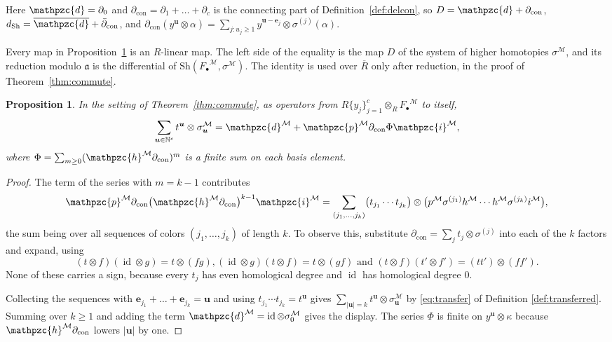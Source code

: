 \documentclass[12pt]{amsart}
\theoremstyle{plain}
\newtheorem{proposition}[theorem]{Proposition}
\theoremstyle{definition}
\newcommand{\dcon}{\partial_{\mathrm{con}}}
\newcommand{\F}{ {F_\bullet} }
\newcommand{\Rbar}{\overline{R}}
\newcommand{\M}{\mathcal{M}}
\newcommand{\lift}[1]{\mathpzc{#1}}
\newcommand{\id}{\operatorname{id}}
\newcommand{\aaa}{\mathfrak{a}}
\newcommand{\N}{\mathbb{N}}
\newcommand{\Sh}{\mathrm{Sh}}
\begin{document}
Here $\lift{d} = \partial_0$ and $\dcon = \partial_1 + \dots + \partial_c$ is the connecting part of Definition~\ref{def:delcon}, so $D = \lift{d} + \dcon$, $d_{\Sh} = \overline{\lift{d}} + \bar\partial_{\mathrm{con}}$, and $\dcon(y^{\boldsymbol{u}} \otimes \alpha) = \sum_{j : u_j \ge 1} y^{\boldsymbol{u} - \boldsymbol{e}_j} \otimes \sigma^{(j)}(\alpha)$.

Every map in Proposition~\ref{prop:closed} is an $R$-linear map.
The left side of the equality is the map $D$ of the system of higher homotopies $\sigma^{\M}$, and its reduction modulo $\aaa$ is the differential of $\Sh(\F^{\M}, \sigma^{\M})$. The identity is used over $\Rbar$ only after reduction, in the proof of Theorem~\ref{thm:commute}.

\begin{proposition}\label{prop:closed}
     In the setting of Theorem~\ref{thm:commute}, as operators from $R\{y_j\}_{j=1}^{c} \otimes_R \F^{\M}$ to itself,
    \[
        \sum_{\boldsymbol{u} \in \N^c} t^{\boldsymbol{u}} \otimes \sigma^{\M}_{\boldsymbol{u}} = \lift{d}^{\M} + \lift{p}^{\M} \dcon \Phi \lift{i}^{\M} ,
    \]
    where $\Phi = \sum_{m \ge 0} (\lift{h}^{\M} \dcon)^m$ is a finite sum on each basis element.
\end{proposition}

\begin{proof}
    The term of the series with $m = k - 1$ contributes
     \[
        \lift{p}^{\M} \dcon \bigl( \lift{h}^{\M} \dcon \bigr)^{k-1} \lift{i}^{\M} = \sum_{(j_1, \dots, j_k)} \bigl( t_{j_1} \cdots t_{j_k} \bigr) \otimes \bigl( p^{\M} \sigma^{(j_1)} h^{\M} \cdots h^{\M} \sigma^{(j_k)} i^{\M} \bigr),
    \]
    the sum being over all sequences of colors $(j_1, \dots, j_k)$ of length $k$.
    To
     observe this, substitute $\dcon = \sum_j t_j \otimes \sigma^{(j)}$ into each of the $k$ factors
    and expand, using $$(t \otimes f)(\id \otimes g) = t \otimes (fg), (\id \otimes g)(t \otimes f) = t \otimes (gf) \text{ and } (t \otimes f)(t' \otimes f') = (tt') \otimes (ff').$$ None of these carries a sign, because every $t_j$ has even homological degree and $\id$ has homological degree $0$.

    Collecting the sequences with $\boldsymbol{e}_{j_1} + \dots + \boldsymbol{e}_{j_k} = \boldsymbol{u}$ and using $t_{j_1} \cdots t_{j_k} = t^{\boldsymbol{u}}$ gives $\sum_{|\boldsymbol{u}| = k} t^{\boldsymbol{u}} \otimes \sigma^{\M}_{\boldsymbol{u}}$ by \eqref{eq:transfer} of Definition \ref{def:transferred}. Summing over $k \ge 1$ and adding the term $\lift{d}^{\M} = \id \otimes \sigma^{\M}_0$ gives the display.
    The series $\Phi$ is finite on $y^{\boldsymbol{u}} \otimes \kappa$ because $\lift{h}^{\M} \dcon$ lowers $|\boldsymbol{u}|$ by one.
\end{proof}
\end{document}
